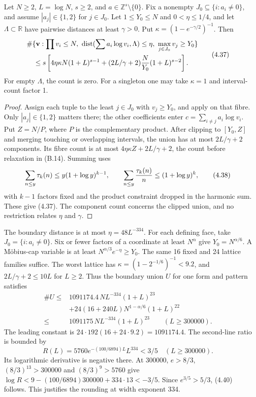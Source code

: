 \begin{lemma}
Let $N\ge2$, $L=\log N$, $s\ge2$, and $a\in\mathbb Z^s\setminus\{0\}$.
Fix a nonempty $J_0\subseteq\{i:a_i\ne0\}$, and assume $|a_j|\in\{1,2\}$ for $j\in J_0$.
Let $1\le Y_0\le N$ and $0<\eta\le1/4$, and let $\Lambda\subset\mathbb R$ have pairwise distances at least $\gamma>0$.
Put $\kappa=(1-e^{-\gamma/2})^{-1}$.
Then
\[
\begin{aligned}
 &\#\{\mathbf v:\prod v_i\le N,\
 \operatorname{dist}(\sum a_i\log v_i,\Lambda)\le\eta,\
                         \max_{j\in J_0}v_j\ge Y_0\}\\
 &\quad\le s\left[4\eta\kappa N(1+L)^{s-1}
       +(2L/\gamma+2){N\over Y_0}(1+L)^{s-2}\right].
\end{aligned}
 \tag{4.37}
\]
For empty $\Lambda$, the count is zero.
For a singleton one may take $\kappa=1$ and interval-count factor 1.
\end{lemma}
\begin{proof}
Assign each tuple to the least $j\in J_0$ with $v_j\ge Y_0$, and apply \cite[Lemma~B.2, (B.14)]{Z1} on that fibre.
Only $|a_j|\in\{1,2\}$ matters there; the other coefficients enter $c=\sum_{i\ne j}a_i\log v_i$.
Put $Z=N/P$, where $P$ is the complementary product.
After clipping to $[Y_0,Z]$ and merging touching or overlapping intervals, the union has at most $2L/\gamma+2$ components.
Its fibre count is at most $4\eta\kappa Z+2L/\gamma+2$, the count before relaxation in (B.14).
Summing uses
\[
 \sum_{n\le y}\tau_k(n)\le y(1+\log y)^{k-1},\qquad
 \sum_{n\le y}{\tau_k(n)\over n}\le(1+\log y)^k,
 \tag{4.38}
\]
with $k-1$ factors fixed and the product constraint dropped in the harmonic sum.
These give (4.37).
The component count concerns the clipped union, and no restriction relates $\eta$ and $\gamma$.
\end{proof}

The boundary distance is at most $\eta=48L^{-334}$.
For each defining face, take $J_0=\{i:a_i\ne0\}$.
Six or fewer factors of a coordinate at least $N^\alpha$ give $Y_0=N^{\alpha/6}$.
A M\"obius-cap variable is at least $N^{\alpha/3}e^{-\eta}\ge Y_0$.
The same 16 fixed and 24 lattice families suffice.
The worst lattice has $\kappa=(1-2^{-1/6})^{-1}<9.2$, and $2L/\gamma+2\le10L$ for $L\ge2$.
Thus the boundary union $U$ for one form and pattern satisfies
\[
\begin{aligned}
 \#U\le{}&1091174.4\,NL^{-334}(1+L)^{23}\\
 &+24(16+240L)N^{1-\alpha/6}(1+L)^{22}\\
 \le{}&1091175\,NL^{-334}(1+L)^{23}\qquad(L\ge300000).
\end{aligned}
 \tag{4.39}
\]
The leading constant is $24\cdot192(16+24\cdot9.2)=1091174.4$.
The second-line ratio is bounded by
\[
 R(L)=5760e^{-(100/6894)L}L^{334}<3/5\quad(L\ge300000).
 \tag{4.40}
\]
Its logarithmic derivative is negative there.
At 300000, $e>8/3$, $(8/3)^{13}>300000$ and $(8/3)^9>5760$ give $\log R<9-(100/6894)300000+334\cdot13<-3/5$.
Since $e^{3/5}>5/3$, (4.40) follows.
This justifies the rounding at width exponent 334.

